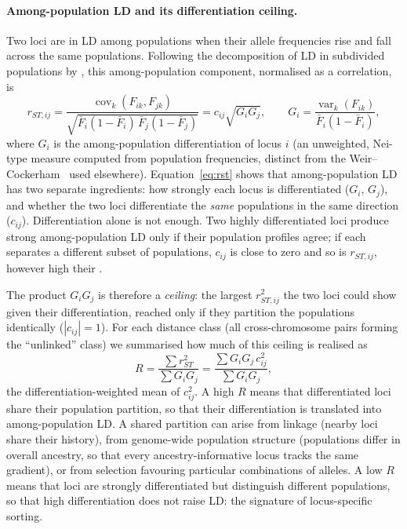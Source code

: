 \paragraph{Among-population LD and its differentiation ceiling.} Two loci are in LD among populations when their allele frequencies rise and fall across the same populations. Following the decomposition of LD in subdivided populations by \citet{ohta1982linkage}, this among-population component, normalised as a correlation, is
\begin{equation}
r_{ST,ij}=\frac{\operatorname{cov}_k(F_{ik},F_{jk})}{\sqrt{\bar F_i(1-\bar F_i)\,\bar F_j(1-\bar F_j)}}=c_{ij}\sqrt{G_iG_j},
\qquad G_i=\frac{\operatorname{var}_k(F_{ik})}{\bar F_i(1-\bar F_i)},
\label{eq:rst}
\end{equation}
where $G_i$ is the among-population differentiation of locus $i$ (an unweighted, Nei-type measure computed from population frequencies, distinct from the Weir--Cockerham \FST\ used elsewhere). Equation~\eqref{eq:rst} shows that among-population LD has two separate ingredients: how strongly each locus is differentiated ($G_i$, $G_j$), and whether the two loci differentiate the \emph{same} populations in the same direction ($c_{ij}$). Differentiation alone is not enough. Two highly differentiated loci produce strong among-population LD only if their population profiles agree; if each separates a different subset of populations, $c_{ij}$ is close to zero and so is $r_{ST,ij}$, however high their \FST.

The product $G_iG_j$ is therefore a \emph{ceiling}: the largest $r_{ST,ij}^2$ the two loci could show given their differentiation, reached only if they partition the populations identically ($|c_{ij}|=1$). For each distance class (all cross-chromosome pairs forming the ``unlinked'' class) we summarised how much of this ceiling is realised as
\begin{equation}
R=\frac{\sum r_{ST}^2}{\sum G_iG_j}=\frac{\sum G_iG_j\,c_{ij}^2}{\sum G_iG_j},
\label{eq:realised}
\end{equation}
the differentiation-weighted mean of $c_{ij}^2$. A high $R$ means that differentiated loci share their population partition, so that their differentiation is translated into among-population LD. A shared partition can arise from linkage (nearby loci share their history), from genome-wide population structure (populations differ in overall ancestry, so that every ancestry-informative locus tracks the same gradient), or from selection favouring particular combinations of alleles. A low $R$ means that loci are strongly differentiated but distinguish different populations, so that high differentiation does not raise LD: the signature of locus-specific sorting.

